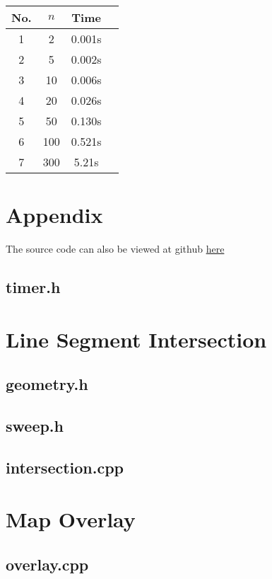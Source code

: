 \documentclass[11pt]{article}
\begin{document}
\begin{center}
    \begin{tabular}{c | c | c | c }
        No. & $n$ & Time   \\
        \hline %
        1   & 2   & 0.001s \\
        2   & 5   & 0.002s \\
        3   & 10  & 0.006s \\
        4   & 20  & 0.026s \\
        5   & 50  & 0.130s \\
        6   & 100 & 0.521s \\
        7   & 300 & 5.21s  \\
    \end{tabular}
\end{center}

\newpage

\section*{Appendix}
\par The source code can also be viewed at github \href{https://github.com/rohitkotha10/CS-F402_Assignment.git}{here}
\subsection*{timer.h}

\section*{Line Segment Intersection}
\subsection*{geometry.h}

\subsection*{sweep.h}

\subsection*{intersection.cpp}


\section*{Map Overlay}
\subsection*{overlay.cpp}

\end{document}
